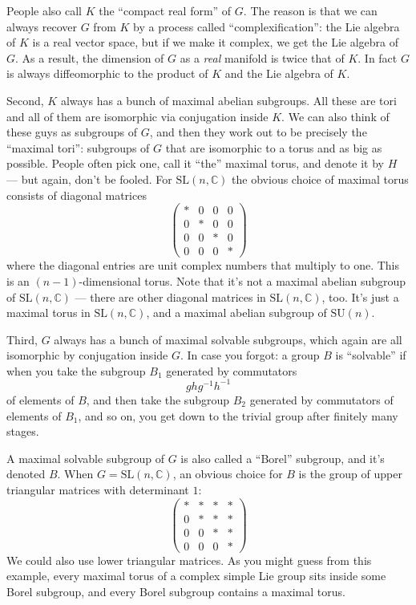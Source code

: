 \documentclass{article}
\begin{document}
People also call \(K\) the ``compact real form'' of \(G\). The reason is
that we can always recover \(G\) from \(K\) by a process called
``complexification'': the Lie algebra of \(K\) is a real vector space,
but if we make it complex, we get the Lie algebra of \(G\). As a result,
the dimension of \(G\) as a \emph{real} manifold is twice that of \(K\).
In fact \(G\) is always diffeomorphic to the product of \(K\) and the
Lie algebra of \(K\).

Second, \(K\) always has a bunch of maximal abelian subgroups. All these
are tori and all of them are isomorphic via conjugation inside \(K\). We
can also think of these guys as subgroups of \(G\), and then they work
out to be precisely the ``maximal tori'': subgroups of \(G\) that are
isomorphic to a torus and as big as possible. People often pick one,
call it ``the'' maximal torus, and denote it by \(H\) --- but again,
don't be fooled. For \(\mathrm{SL}(n,\mathbb{C})\) the obvious choice of
maximal torus consists of diagonal matrices \[
  \left(
    \begin{array}{cccc}
      *&0&0&0
    \\0&*&0&0
    \\0&0&*&0
    \\0&0&0&*
    \end{array}
  \right)
\] where the diagonal entries are unit complex numbers that multiply to
one. This is an \((n-1)\)-dimensional torus. Note that it's not a
maximal abelian subgroup of \(\mathrm{SL}(n,\mathbb{C})\) --- there are
other diagonal matrices in \(\mathrm{SL}(n,\mathbb{C})\), too. It's just
a maximal torus in \(\mathrm{SL}(n,\mathbb{C})\), and a maximal abelian
subgroup of \(\mathrm{SU}(n)\).

Third, \(G\) always has a bunch of maximal solvable subgroups, which
again are all isomorphic by conjugation inside \(G\). In case you
forgot: a group \(B\) is ``solvable'' if when you take the subgroup
\(B_1\) generated by commutators \[ghg^{-1}h^{-1}\] of elements of
\(B\), and then take the subgroup \(B_2\) generated by commutators of
elements of \(B_1\), and so on, you get down to the trivial group after
finitely many stages.

A maximal solvable subgroup of \(G\) is also called a ``Borel''
subgroup, and it's denoted \(B\). When
\(G = \mathrm{SL}(n,\mathbb{C})\), an obvious choice for \(B\) is the
group of upper triangular matrices with determinant \(1\): \[
  \left(
    \begin{array}{cccc}
      *&*&*&*
    \\0&*&*&*
    \\0&0&*&*
    \\0&0&0&*
    \end{array}
  \right)
\] We could also use lower triangular matrices. As you might guess from
this example, every maximal torus of a complex simple Lie group sits
inside some Borel subgroup, and every Borel subgroup contains a maximal
torus.
\end{document}
